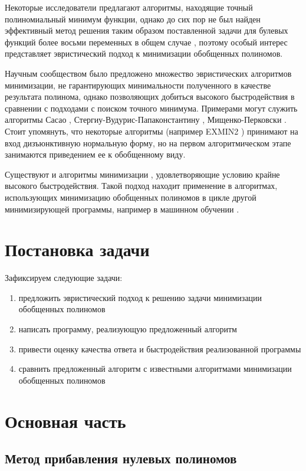 \documentclass[a4paper,12pt,titlepage]{article}
\begin{document}
Некоторые исследователи предлагают алгоритмы, находящие точный полиномиальный минимум \cite{min-tau,exact6,exact} функции, однако до сих пор не был найден эффективный метод решения таким образом поставленной задачи для булевых функций более восьми переменных в общем случае \cite{exact8}, поэтому особый интерес представляет эвристический подход к минимизации обобщенных полиномов.

Научным сообществом было предложено множество эвристических алгоритмов минимизации, не гарантирующих минимальности полученного в качестве результата полинома, однако позволяющих добиться высокого быстродействия в сравнении с подходами с поиском точного минимума. Примерами могут служить алгоритмы Сасао \cite{exmin2}, Стергиу-Вудурис-Папаконстантину \cite{mvesopmin}, Мищенко-Перковски \cite{exorcism4}. Стоит упомянуть, что некоторые алгоритмы (например \textsc{EXMIN2} \cite{exmin2}) принимают на вход дизъюнктивную нормальную форму, но на первом алгоритмическом этапе занимаются приведением ее к обобщенному виду.

Существуют и алгоритмы минимизации \cite{exorcism-mv3}, удовлетворяющие условию крайне высокого быстродействия. Такой подход находит применение в алгоритмах, использующих минимизацию обобщенных полиномов в цикле другой минимизирующей программы, например в машинном обучении \cite{machine-learning}.

\section{Постановка задачи}

Зафиксируем следующие задачи:
\begin{enumerate}
    \item предложить эвристический подход к решению задачи минимизации обобщенных полиномов
    \item написать программу, реализующую предложенный алгоритм
    \item привести оценку качества ответа и быстродействия реализованной программы
    \item сравнить предложенный алгоритм с известными алгоритмами минимизации обобщенных полиномов
\end{enumerate}

\section{Основная часть}

\subsection{Метод прибавления нулевых полиномов}
\end{document}

